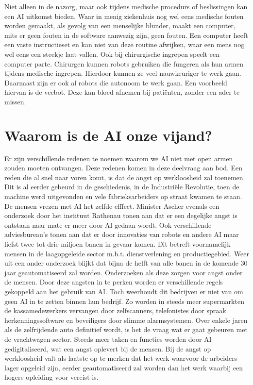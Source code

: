 \documentclass{article}
\begin{document}
Niet alleen in de nazorg, maar ook tijdens medische procedurs of beslissingen kan een AI uitkomst bieden. Waar in menig ziekenhuis
nog wel eens medische fouten worden gemaakt, als gevolg van een menselijke blunder, maakt een computer, mits er geen fouten in de software
aanwezig zijn, geen fouten.\cite{computerziekenhuis} Een computer heeft een vaste instructieset en kan niet van deze routine afwijken, waar
een mens nog wel eens een steekje laat vallen. Ook bij chirurgische ingrepen speelt een computer parte.\cite{medischerobots} Chirurgen kunnen
robots gebruiken die fungeren als hun armen tijdens medische ingrepen. Hierdoor kunnen ze veel nauwkeuriger te werk gaan. Daarnaast zijn er
ook al robots die autonoom te werk gaan. Een voorbeeld hiervan is de veebot. Deze kan bloed afnemen bij pati\"{e}nten, zonder een ader te missen.\cite{veebot}  







\section{Waarom is de AI onze vijand?}
Er zijn verschillende redenen te noemen waarom we AI niet met open armen zouden moeten ontvangen. Deze redenen komen in deze deelvraag aan bod.
Een reden die al snel naar voren komt, is dat de angst op werkloosheid zal toenemen. Dit is al eerder gebeurd in de geschiedenis, in de Industri\"{e}le Revolutie, toen de machine werd uitgevonden en vele fabrieksarbeiders op straat kwamen te staan. De mensen vrezen met AI het zelfde efffect. Minister Ascher\cite{vriendofvijand} evenals een onderzoek door het instituut Rathenau\cite{vriendofvijand}  tonen aan dat er een degelijke angst is ontstaan naar mate er meer door AI gedaan wordt. Ook verschillende adviesbureau's tonen aan dat er door innovaties van robots en andere AI maar liefst twee tot drie miljoen banen in gevaar komen. Dit betreft voornamelijk mensen in de laagopgeleide sector m.b.t. dienstverlening en productiegebied. Weer uit een ander onderzoek\cite{vriendofvijand} blijkt dat bijna de helft van alle banen in de komende 30 jaar geautomatiseerd zal worden. Onderzoeken als deze zorgen voor angst onder de mensen. Door deze angsten in te perken worden er verschillende regels gekoppeld aan het gebruik van AI. Toch weerhoudt dit bedrijven er niet van om geen AI in te zetten binnen hun bedrijf. Zo worden in steeds meer supermarkten de kassamedewerkers vervangen door zelfscanners, telefonistes door spraak herkenningssoftware en beveiligers door slimme alarmsystemen. Over enkele jaren als de zelfrijdende auto definitief wordt, is het de vraag wat er gaat gebeuren met de vrachtwagen sector. Steeds meer taken en functies worden door AI gedigitaliseerd, wat een angst oplevert bij de mensen. Bij de angst op werkloosheid valt als laatste op te merken dat het werk waarvoor de arbeiders lager opgeleid zijn, eerder geautomatiseerd zal worden dan het werk waarbij een hogere opleiding voor vereist is. 
\end{document}
